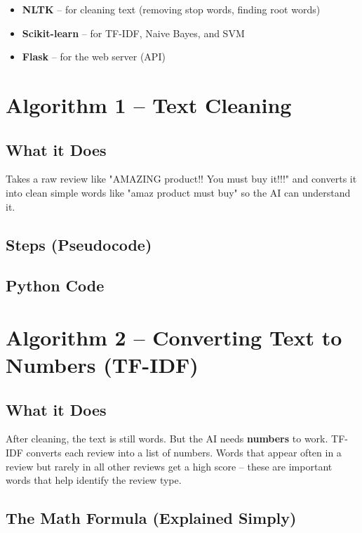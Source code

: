 \documentclass[10pt, a4paper]{report}
\begin{document}
\begin{itemize}
  \item \textbf{NLTK} -- for cleaning text (removing stop words, finding root words)
  \item \textbf{Scikit-learn} -- for TF-IDF, Naive Bayes, and SVM
  \item \textbf{Flask} -- for the web server (API)
\end{itemize}

\section{Algorithm 1 -- Text Cleaning}

\subsection{What it Does}
Takes a raw review like "AMAZING product!! You must buy it!!!" and converts it into clean simple words like "amaz product must buy" so the AI can understand it.

\subsection{Steps (Pseudocode)}

\subsection{Python Code}

\section{Algorithm 2 -- Converting Text to Numbers (TF-IDF)}

\subsection{What it Does}

After cleaning, the text is still words. But the AI needs \textbf{numbers} to work. TF-IDF converts each review into a list of numbers. Words that appear often in a review but rarely in all other reviews get a high score -- these are important words that help identify the review type.

\subsection{The Math Formula (Explained Simply)}
\end{document}
